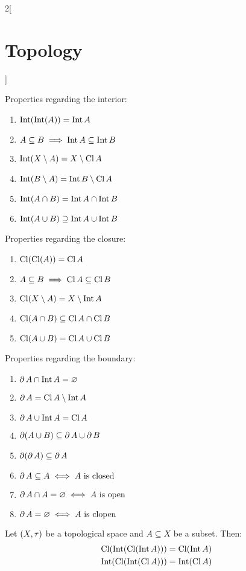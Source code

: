\documentclass[../../../main.tex]{subfiles}
\begin{document}
\begin{multicols}{2}[\section{Topology}]
\begin{prop}
    Properties regarding the interior:
    \begin{enumerate}[leftmargin=1.15cm]\renewcommand{\labelenumi}{1.\arabic{enumi}.}
      \item $\operatorname{Int}(\operatorname{Int} (A))=         \operatorname{Int} A$
      \item $A\subseteq B\implies    \operatorname{Int} A\subseteq\operatorname{Int} B$
      \item $\operatorname{Int}(X\setminus A)=     X\setminus \operatorname{Cl} A$
      \item $\operatorname{Int}(B\setminus A)=     \operatorname{Int} B\setminus \operatorname{Cl} A$
      \item $\operatorname{Int}(A\cap B)=          \operatorname{Int} A\cap\operatorname{Int} B$
      \item $\operatorname{Int}(A\cup B)\supseteq  \operatorname{Int} A\cup\operatorname{Int} B$
    \end{enumerate}
    Properties regarding the closure:
    \begin{enumerate}[leftmargin=1.15cm]\renewcommand{\labelenumi}{2.\arabic{enumi}.}
      \item $\operatorname{Cl}(\operatorname{Cl} (A))=          \operatorname{Cl} A$
      \item $A\subseteq B\implies   \operatorname{Cl} A\subseteq\operatorname{Cl} B$
      \item $\operatorname{Cl}(X\setminus A)=     X\setminus \operatorname{Int} A$
      \item $\operatorname{Cl}(A\cap B)\subseteq  \operatorname{Cl} A\cap\operatorname{Cl} B$
      \item $\operatorname{Cl}(A\cup B)=          \operatorname{Cl} A\cup\operatorname{Cl} B$
    \end{enumerate}
    Properties regarding the boundary:
    \begin{enumerate}[leftmargin=1.15cm]\renewcommand{\labelenumi}{3.\arabic{enumi}.}
      \item $\operatorname{\partial} A\cap\operatorname{Int} A=         \varnothing$
      \item $\operatorname{\partial} A=\operatorname{Cl} A\setminus\operatorname{Int} A$
      \item $\operatorname{\partial} A\cup\operatorname{Int} A=             \operatorname{Cl} A$
      \item $\operatorname{\partial} (A\cup B)\subseteq \operatorname{\partial} A\cup \operatorname{\partial} B$
      \item $\operatorname{\partial} (\operatorname{\partial} A)\subseteq \operatorname{\partial} A$
      \item $\operatorname{\partial} A\subseteq A\iff  A  \text{ is closed}$
      \item $\operatorname{\partial} A\cap A=\varnothing\iff  A\text{ is open}$
      \item $\operatorname{\partial} A=\varnothing\iff\text{$A$ is clopen}$
    \end{enumerate}
  \end{prop}
  \begin{prop}
    Let $(X,\tau)$ be a topological space and $A\subseteq X$ be a subset. Then:
    \begin{gather*}
      \operatorname{Cl}(\operatorname{Int}(\operatorname{Cl}(\operatorname{Int} A)))=\operatorname{Cl}(\operatorname{Int} A)\\
      \operatorname{Int}(\operatorname{Cl}(\operatorname{Int} (\operatorname{Cl} A)))=\operatorname{Int}(\operatorname{Cl} A)
    \end{gather*}
  \end{prop}

\end{multicols}
\end{document}
